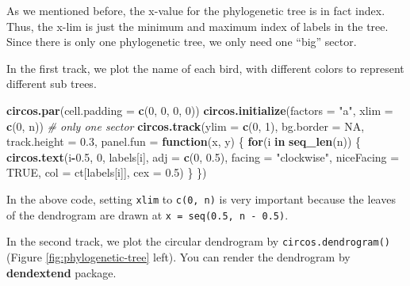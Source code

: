 \documentclass[]{book}
\newenvironment{Shaded}{\begin{snugshade}}{\end{snugshade}}
\newcommand{\KeywordTok}[1]{\textcolor[rgb]{0.13,0.29,0.53}{\textbf{#1}}}
\newcommand{\DataTypeTok}[1]{\textcolor[rgb]{0.13,0.29,0.53}{#1}}
\newcommand{\DecValTok}[1]{\textcolor[rgb]{0.00,0.00,0.81}{#1}}
\newcommand{\FloatTok}[1]{\textcolor[rgb]{0.00,0.00,0.81}{#1}}
\newcommand{\StringTok}[1]{\textcolor[rgb]{0.31,0.60,0.02}{#1}}
\newcommand{\CommentTok}[1]{\textcolor[rgb]{0.56,0.35,0.01}{\textit{#1}}}
\newcommand{\OtherTok}[1]{\textcolor[rgb]{0.56,0.35,0.01}{#1}}
\newcommand{\ControlFlowTok}[1]{\textcolor[rgb]{0.13,0.29,0.53}{\textbf{#1}}}
\newcommand{\OperatorTok}[1]{\textcolor[rgb]{0.81,0.36,0.00}{\textbf{#1}}}
\newcommand{\NormalTok}[1]{#1}
\begin{document}
As we mentioned before, the x-value for the phylogenetic tree is in fact
index. Thus, the x-lim is just the minimum and maximum index of labels
in the tree. Since there is only one phylogenetic tree, we only need one
``big'' sector.

In the first track, we plot the name of each bird, with different colors
to represent different sub trees.

\begin{Shaded}
\begin{Highlighting}[]
\KeywordTok{circos.par}\NormalTok{(}\DataTypeTok{cell.padding =} \KeywordTok{c}\NormalTok{(}\DecValTok{0}\NormalTok{, }\DecValTok{0}\NormalTok{, }\DecValTok{0}\NormalTok{, }\DecValTok{0}\NormalTok{))}
\KeywordTok{circos.initialize}\NormalTok{(}\DataTypeTok{factors =} \StringTok{"a"}\NormalTok{, }\DataTypeTok{xlim =} \KeywordTok{c}\NormalTok{(}\DecValTok{0}\NormalTok{, n)) }\CommentTok{# only one sector}
\KeywordTok{circos.track}\NormalTok{(}\DataTypeTok{ylim =} \KeywordTok{c}\NormalTok{(}\DecValTok{0}\NormalTok{, }\DecValTok{1}\NormalTok{), }\DataTypeTok{bg.border =} \OtherTok{NA}\NormalTok{, }\DataTypeTok{track.height =} \FloatTok{0.3}\NormalTok{, }
    \DataTypeTok{panel.fun =} \ControlFlowTok{function}\NormalTok{(x, y) \{}
        \ControlFlowTok{for}\NormalTok{(i }\ControlFlowTok{in} \KeywordTok{seq_len}\NormalTok{(n)) \{}
            \KeywordTok{circos.text}\NormalTok{(i}\OperatorTok{-}\FloatTok{0.5}\NormalTok{, }\DecValTok{0}\NormalTok{, labels[i], }\DataTypeTok{adj =} \KeywordTok{c}\NormalTok{(}\DecValTok{0}\NormalTok{, }\FloatTok{0.5}\NormalTok{), }
                \DataTypeTok{facing =} \StringTok{"clockwise"}\NormalTok{, }\DataTypeTok{niceFacing =} \OtherTok{TRUE}\NormalTok{,}
                \DataTypeTok{col =}\NormalTok{ ct[labels[i]], }\DataTypeTok{cex =} \FloatTok{0.5}\NormalTok{)}
\NormalTok{        \}}
\NormalTok{\})}
\end{Highlighting}
\end{Shaded}

In the above code, setting \texttt{xlim} to \texttt{c(0,\ n)} is very
important because the leaves of the dendrogram are drawn at
\texttt{x\ =\ seq(0.5,\ n\ -\ 0.5)}.

In the second track, we plot the circular dendrogram by
\texttt{circos.dendrogram()} (Figure \ref{fig:phylogenetic-tree} left).
You can render the dendrogram by \textbf{dendextend} package.
\end{document}
